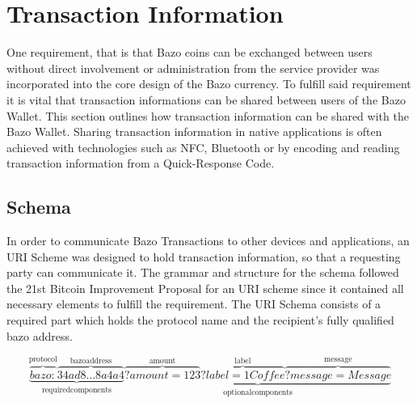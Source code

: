 \section{Transaction Information} \label{transactioninfo}
One requirement, that is that Bazo coins can be exchanged between users without direct involvement or administration from the service provider was incorporated into the core design of the Bazo currency. To fulfill said requirement it is vital that transaction informations can be shared between users of the Bazo Wallet. This section outlines how transaction information can be shared with the Bazo Wallet.
Sharing transaction information in native applications is often achieved with technologies such as NFC, Bluetooth or by encoding and reading transaction information from a Quick-Response Code.
\subsection{Schema}\label{schema}
In order to communicate Bazo Transactions to other devices and applications, an URI Scheme was designed to hold transaction information, so that a requesting party can communicate it. The grammar and structure for the schema followed the \cite{bip21} 21st Bitcoin Improvement Proposal for an URI scheme since it contained all necessary elements to fulfill the requirement. The URI Schema consists of a required part which holds the protocol name and the recipient's fully qualified bazo address.


\[
\underbrace{\overbrace{bazo:}^{\mathrm{protocol}}\overbrace{34ad8...8a4a4}^{\mathrm{bazo address}}}_{\mathrm{required components}}
\underbrace{\overbrace{?amount=123}^{\mathrm{amoun t}}\overbrace{?label=1 Coffee}^{\mathrm{label}}\overbrace{?message=Message}^{\mathrm{message}}}_{\mathrm{optional components}}
\]


